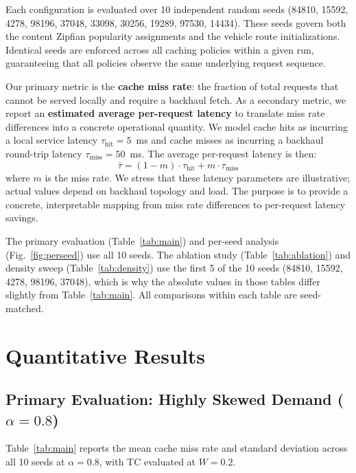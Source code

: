 \documentclass[preprint,12pt]{elsarticle}
\begin{document}
	Each configuration is evaluated over 10 independent random seeds (84810, 15592, 4278, 98196, 37048, 33098, 30256, 19289, 97530, 14434). These seeds govern both the content Zipfian popularity assignments and the vehicle route initializations. Identical seeds are enforced across all caching policies within a given run, guaranteeing that all policies observe the same underlying request sequence.
	
	Our primary metric is the \textbf{cache miss rate}: the fraction of total requests that cannot be served locally and require a backhaul fetch. As a secondary metric, we report an \textbf{estimated average per-request latency} to translate miss rate differences into a concrete operational quantity. We model cache hits as incurring a local service latency $\tau_\text{hit} = 5$~ms and cache misses as incurring a backhaul round-trip latency $\tau_\text{miss} = 50$~ms. The average per-request latency is then:
	\begin{equation}
		\bar{\tau} = (1 - m) \cdot \tau_\text{hit} + m \cdot \tau_\text{miss}
		\label{eq:latency}
	\end{equation}
	where $m$ is the miss rate. We stress that these latency parameters are illustrative; actual values depend on backhaul topology and load. The purpose is to provide a concrete, interpretable mapping from miss rate differences to per-request latency savings.
	
	The primary evaluation (Table~\ref{tab:main}) and per-seed analysis (Fig.~\ref{fig:perseed}) use all 10 seeds. The ablation study (Table~\ref{tab:ablation}) and density sweep (Table~\ref{tab:density}) use the first 5 of the 10 seeds (84810, 15592, 4278, 98196, 37048), which is why the absolute values in those tables differ slightly from Table~\ref{tab:main}. All comparisons within each table are seed-matched.
	
	\section{Quantitative Results}
	\label{sec:results}
	
	\subsection{Primary Evaluation: Highly Skewed Demand ($\alpha = 0.8$)}
	\label{sec:primary}
	
	Table~\ref{tab:main} reports the mean cache miss rate and standard deviation across all 10 seeds at $\alpha = 0.8$, with TC evaluated at $W = 0.2$.
	
\end{document}
